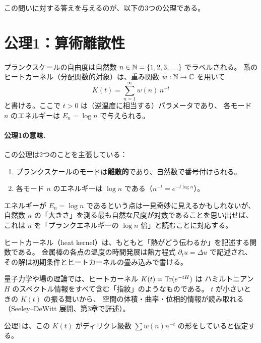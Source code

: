 この問いに対する答えを与えるのが、以下の3つの公理である。


\section{公理1：算術離散性}
\label{sec:axiom1}

\begin{dfnbox}[公理1（算術離散性）]
プランクスケールの自由度は自然数 $n \in \mathbb{N} = \{1, 2, 3, \ldots\}$ でラベルされる。
系のヒートカーネル（分配関数的対象）は、重み関数 $w : \mathbb{N} \to \mathbb{C}$ を用いて
\begin{equation}
  K(t) = \sum_{n=1}^{\infty} w(n)\, n^{-t}
  \label{eq:heat-kernel-general}
\end{equation}
と書ける。ここで $t > 0$ は（逆温度に相当する）パラメータであり、
各モード $n$ のエネルギーは $E_n = \log n$ で与えられる。
\end{dfnbox}

\paragraph{公理1の意味.}
この公理は2つのことを主張している：
\begin{enumerate}
  \item プランクスケールのモードは\textbf{離散的}であり、自然数で番号付けられる。
  \item 各モード $n$ のエネルギーは $\log n$ である（$n^{-t} = e^{-t \log n}$）。
\end{enumerate}

エネルギーが $E_n = \log n$ であるという点は一見奇妙に見えるかもしれないが、
自然数 $n$ の「大きさ」を測る最も自然な尺度が対数であることを思い出せば、
これは $n$ を「プランクエネルギーの $\log n$ 倍」と読むことに対応する。

\begin{hsbox}
ヒートカーネル（heat kernel）は、もともと「熱がどう伝わるか」を記述する関数である。
金属棒の各点の温度の時間発展は熱方程式 $\partial_t u = \Delta u$ で記述され、
その解は初期条件とヒートカーネルの畳み込みで書ける。

量子力学や場の理論では、ヒートカーネル $K(t) = \operatorname{Tr}(e^{-tH})$ は
ハミルトニアン $H$ のスペクトル情報をすべて含む「指紋」のようなものである。
$t$ が小さいときの $K(t)$ の振る舞いから、
空間の体積・曲率・位相的情報が読み取れる（Seeley--DeWitt 展開、第3章で詳述）。

公理1は、この $K(t)$ がディリクレ級数 $\sum w(n) n^{-t}$ の形をしていると仮定する。
\end{hsbox}


